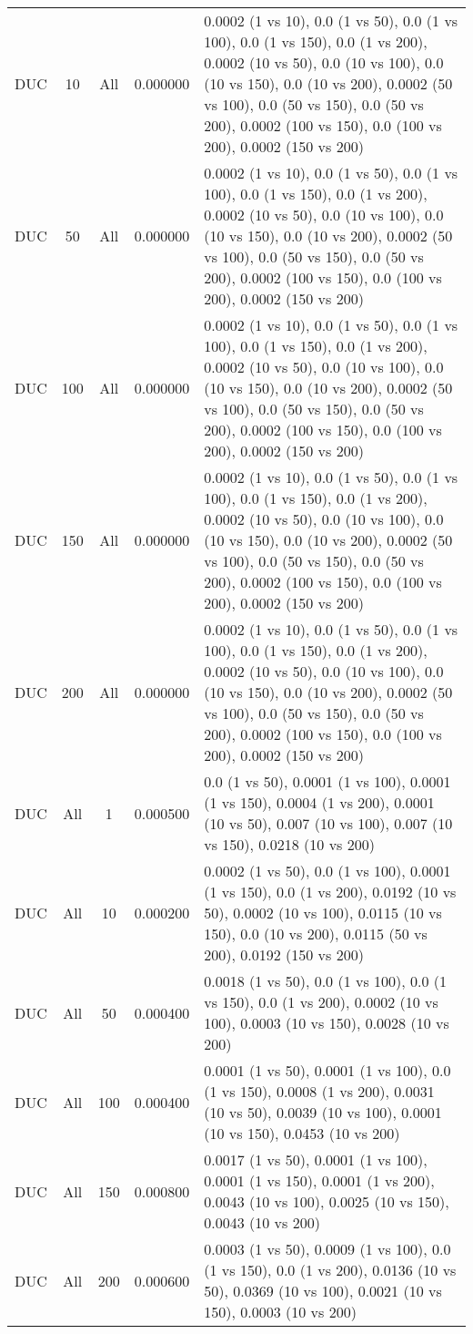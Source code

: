 \begin{tabular}{|l|c|c|c|p{7cm}|}
DUC & 10 & All & 0.000000 & 0.0002 (1 vs 10), 0.0 (1 vs 50), 0.0 (1 vs 100), 0.0 (1 vs 150), 0.0 (1 vs 200), 0.0002 (10 vs 50), 0.0 (10 vs 100), 0.0 (10 vs 150), 0.0 (10 vs 200), 0.0002 (50 vs 100), 0.0 (50 vs 150), 0.0 (50 vs 200), 0.0002 (100 vs 150), 0.0 (100 vs 200), 0.0002 (150 vs 200) \\
DUC & 50 & All & 0.000000 & 0.0002 (1 vs 10), 0.0 (1 vs 50), 0.0 (1 vs 100), 0.0 (1 vs 150), 0.0 (1 vs 200), 0.0002 (10 vs 50), 0.0 (10 vs 100), 0.0 (10 vs 150), 0.0 (10 vs 200), 0.0002 (50 vs 100), 0.0 (50 vs 150), 0.0 (50 vs 200), 0.0002 (100 vs 150), 0.0 (100 vs 200), 0.0002 (150 vs 200) \\
DUC & 100 & All & 0.000000 & 0.0002 (1 vs 10), 0.0 (1 vs 50), 0.0 (1 vs 100), 0.0 (1 vs 150), 0.0 (1 vs 200), 0.0002 (10 vs 50), 0.0 (10 vs 100), 0.0 (10 vs 150), 0.0 (10 vs 200), 0.0002 (50 vs 100), 0.0 (50 vs 150), 0.0 (50 vs 200), 0.0002 (100 vs 150), 0.0 (100 vs 200), 0.0002 (150 vs 200) \\
DUC & 150 & All & 0.000000 & 0.0002 (1 vs 10), 0.0 (1 vs 50), 0.0 (1 vs 100), 0.0 (1 vs 150), 0.0 (1 vs 200), 0.0002 (10 vs 50), 0.0 (10 vs 100), 0.0 (10 vs 150), 0.0 (10 vs 200), 0.0002 (50 vs 100), 0.0 (50 vs 150), 0.0 (50 vs 200), 0.0002 (100 vs 150), 0.0 (100 vs 200), 0.0002 (150 vs 200) \\
DUC & 200 & All & 0.000000 & 0.0002 (1 vs 10), 0.0 (1 vs 50), 0.0 (1 vs 100), 0.0 (1 vs 150), 0.0 (1 vs 200), 0.0002 (10 vs 50), 0.0 (10 vs 100), 0.0 (10 vs 150), 0.0 (10 vs 200), 0.0002 (50 vs 100), 0.0 (50 vs 150), 0.0 (50 vs 200), 0.0002 (100 vs 150), 0.0 (100 vs 200), 0.0002 (150 vs 200) \\
DUC & All & 1 & 0.000500 & 0.0 (1 vs 50), 0.0001 (1 vs 100), 0.0001 (1 vs 150), 0.0004 (1 vs 200), 0.0001 (10 vs 50), 0.007 (10 vs 100), 0.007 (10 vs 150), 0.0218 (10 vs 200) \\
DUC & All & 10 & 0.000200 & 0.0002 (1 vs 50), 0.0 (1 vs 100), 0.0001 (1 vs 150), 0.0 (1 vs 200), 0.0192 (10 vs 50), 0.0002 (10 vs 100), 0.0115 (10 vs 150), 0.0 (10 vs 200), 0.0115 (50 vs 200), 0.0192 (150 vs 200) \\
DUC & All & 50 & 0.000400 & 0.0018 (1 vs 50), 0.0 (1 vs 100), 0.0 (1 vs 150), 0.0 (1 vs 200), 0.0002 (10 vs 100), 0.0003 (10 vs 150), 0.0028 (10 vs 200) \\
DUC & All & 100 & 0.000400 & 0.0001 (1 vs 50), 0.0001 (1 vs 100), 0.0 (1 vs 150), 0.0008 (1 vs 200), 0.0031 (10 vs 50), 0.0039 (10 vs 100), 0.0001 (10 vs 150), 0.0453 (10 vs 200) \\
DUC & All & 150 & 0.000800 & 0.0017 (1 vs 50), 0.0001 (1 vs 100), 0.0001 (1 vs 150), 0.0001 (1 vs 200), 0.0043 (10 vs 100), 0.0025 (10 vs 150), 0.0043 (10 vs 200) \\
DUC & All & 200 & 0.000600 & 0.0003 (1 vs 50), 0.0009 (1 vs 100), 0.0 (1 vs 150), 0.0 (1 vs 200), 0.0136 (10 vs 50), 0.0369 (10 vs 100), 0.0021 (10 vs 150), 0.0003 (10 vs 200) \\
\bottomrule
\end{tabular}
